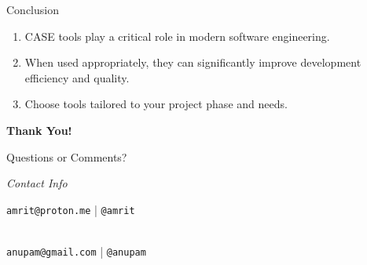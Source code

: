 \documentclass[14pt, aspectratio=169]{beamer}
\begin{document}
\begin{frame}{Conclusion}
	\begin{enumerate}
		\item<1-> CASE tools play a critical role in modern software engineering. \pause
		\item<2-> When used appropriately, they can significantly improve development efficiency and quality. \pause
		\item<3-> Choose tools tailored to your project phase and needs.
	\end{enumerate}
\end{frame}

\begin{frame}[plain]
	\begin{center}
		\vfill
		{\Huge\bfseries Thank You! \par}
		\vspace{1.5cm}
		{\Large Questions or Comments?} \par
		\vspace{0.5cm}
		\textit{Contact Info} \par
		\vspace{0.3cm}
		\texttt{amrit@proton.me} \quad | \quad \texttt{@amrit} \quad \par\\
		\texttt{anupam@gmail.com} \quad | \quad \texttt{@anupam} \quad \par




\end{center}
\end{frame}
\end{document}
